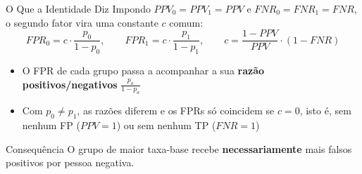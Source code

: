 \documentclass[aspectratio=169,xcolor=dvipsnames]{beamer}
\begin{document}
  \begin{frame}{O Que a Identidade Diz}
    Impondo $PPV_0 = PPV_1 = PPV$ e $FNR_0 = FNR_1 = FNR$, o segundo fator vira uma constante $c$ comum:
    \[
      FPR_0 = c \cdot \frac{p_0}{1-p_0},
      \qquad
      FPR_1 = c \cdot \frac{p_1}{1-p_1},
      \qquad
      c = \frac{1 - PPV}{PPV} \cdot (1 - FNR)
    \]

    \vspace{0.2em}
    \begin{itemize}\setlength{\itemsep}{0.4em}
      \item O FPR de cada grupo passa a acompanhar a sua \textbf{razão positivos/negativos} $\frac{p_a}{1-p_a}$
      \item Com $p_0 \neq p_1$, as razões diferem e os FPRs só coincidem se $c = 0$, isto é, sem nenhum FP ($PPV = 1$) ou sem nenhum TP ($FNR = 1$)
    \end{itemize}

    \vspace{0.4em}
    \begin{alertblock}{Consequência}
      O grupo de maior taxa-base recebe \textbf{necessariamente} mais falsos positivos por pessoa negativa.
    \end{alertblock}
  \end{frame}
\end{document}
